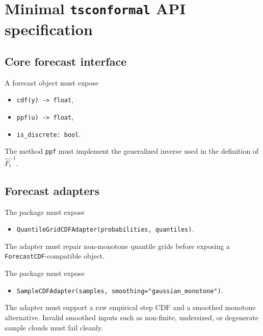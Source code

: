 \section{Minimal \texttt{tsconformal} API specification}

\subsection{Core forecast interface}

\begin{description}[leftmargin=0pt,labelindent=0pt,style=nextline]
\item[\texttt{ForecastCDF}]
A forecast object must expose
\begin{itemize}[leftmargin=1.5em]
    \item \texttt{cdf(y) -> float},
    \item \texttt{ppf(u) -> float},
    \item \texttt{is\_discrete: bool}.
\end{itemize}
The method \texttt{ppf} must implement the generalized inverse used in the definition of $\widehat F_t^{-1}$.
\end{description}

\subsection{Forecast adapters}

\begin{description}[leftmargin=0pt,labelindent=0pt,style=nextline]
\item[\texttt{QuantileGridCDFAdapter}]
The package must expose
\begin{itemize}[leftmargin=1.5em]
    \item \texttt{QuantileGridCDFAdapter(probabilities, quantiles)}.
\end{itemize}
The adapter must repair non-monotone quantile grids before exposing a \texttt{ForecastCDF}-compatible object.

\item[\texttt{SampleCDFAdapter}]
The package must expose
\begin{itemize}[leftmargin=1.5em]
    \item \texttt{SampleCDFAdapter(samples, smoothing="gaussian\_monotone")}.
\end{itemize}
The adapter must support a raw empirical step CDF and a smoothed monotone alternative. Invalid smoothed inputs such as non-finite, undersized, or degenerate sample clouds must fail cleanly.
\end{description}

